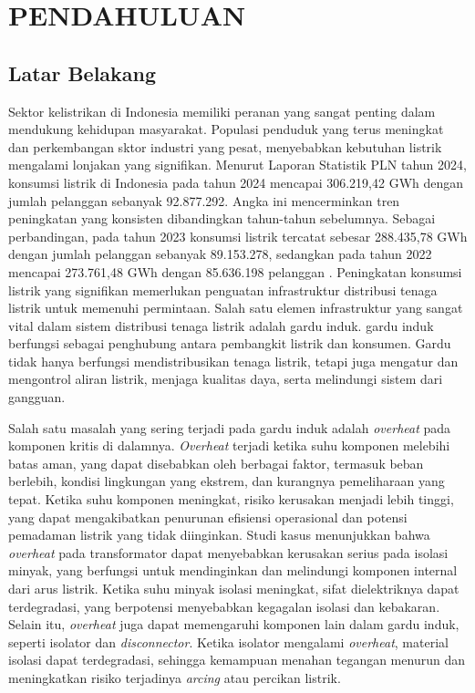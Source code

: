 \chapter{PENDAHULUAN}
\label{chap:pendahuluan}

\section{Latar Belakang}
\label{sec:latarbelakang}
\sloppy
Sektor kelistrikan di Indonesia memiliki peranan yang sangat penting dalam mendukung kehidupan masyarakat. Populasi penduduk yang terus meningkat dan perkembangan sktor industri yang pesat, menyebabkan kebutuhan listrik mengalami lonjakan yang signifikan. Menurut Laporan Statistik PLN tahun 2024, konsumsi listrik di Indonesia pada tahun 2024 mencapai 306.219,42 GWh dengan jumlah pelanggan sebanyak 92.877.292. Angka ini mencerminkan tren peningkatan yang konsisten dibandingkan tahun-tahun sebelumnya. Sebagai perbandingan, pada tahun 2023 konsumsi listrik tercatat sebesar 288.435,78 GWh dengan jumlah pelanggan sebanyak 89.153.278, sedangkan pada tahun 2022 mencapai 273.761,48 GWh dengan 85.636.198 pelanggan \cite{PLN2024}. Peningkatan konsumsi listrik yang signifikan memerlukan penguatan infrastruktur distribusi tenaga listrik untuk  memenuhi permintaan. Salah satu elemen infrastruktur yang sangat vital dalam sistem distribusi tenaga listrik adalah gardu induk. gardu induk berfungsi sebagai penghubung antara pembangkit listrik dan konsumen. Gardu tidak hanya berfungsi mendistribusikan tenaga listrik, tetapi juga mengatur dan mengontrol aliran listrik, menjaga kualitas daya, serta melindungi sistem dari gangguan.


Salah satu masalah yang sering terjadi pada gardu induk adalah \emph{overheat} pada komponen kritis di dalamnya. \emph{Overheat} terjadi ketika suhu komponen melebihi batas aman, yang dapat disebabkan oleh berbagai faktor, termasuk beban berlebih, kondisi lingkungan yang ekstrem, dan kurangnya pemeliharaan yang tepat\cite{Bailey2022}. Ketika suhu komponen meningkat, risiko kerusakan menjadi lebih tinggi, yang dapat mengakibatkan penurunan efisiensi operasional dan potensi pemadaman listrik yang tidak diinginkan\cite{Aksenovich2022}. Studi kasus menunjukkan bahwa \emph{overheat} pada transformator dapat menyebabkan kerusakan serius pada isolasi minyak, yang berfungsi untuk mendinginkan dan melindungi komponen internal dari arus listrik. Ketika suhu minyak isolasi meningkat, sifat dielektriknya dapat terdegradasi, yang berpotensi menyebabkan kegagalan isolasi dan kebakaran\cite{Kalathiripi2017}. Selain itu, \emph{overheat} juga dapat memengaruhi komponen lain dalam gardu induk, seperti isolator dan \emph{disconnector}. Ketika isolator mengalami \emph{overheat}, material isolasi dapat terdegradasi, sehingga kemampuan menahan tegangan menurun dan meningkatkan risiko terjadinya \emph{arcing} atau percikan listrik\cite{Li2017}.

